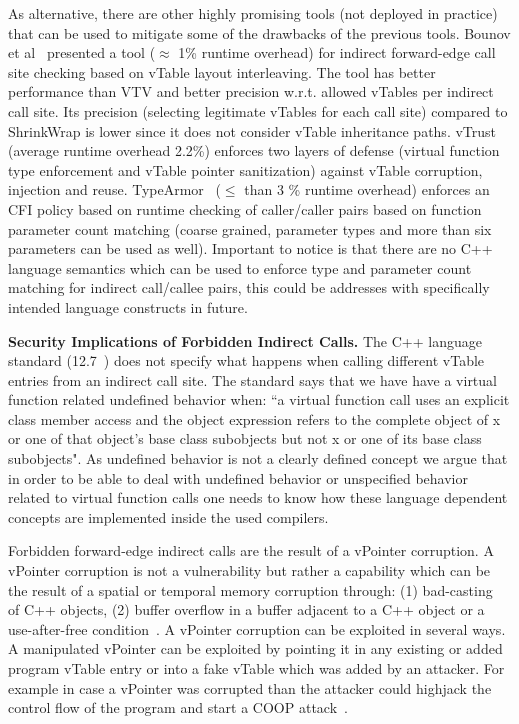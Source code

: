 As alternative, there are other highly promising tools (not deployed in practice) that can be used to mitigate 
some of the drawbacks of the previous tools. 
Bounov et al~\cite{bounov:interleaving} presented a tool ($\approx$ 1\% runtime overhead)
for indirect forward-edge call site checking based on vTable layout interleaving. The tool has better performance
than VTV and better precision w.r.t. allowed vTables per indirect call site. Its precision (selecting legitimate vTables for each call site)
compared to ShrinkWrap is lower since it does not consider vTable inheritance paths.
vTrust~\cite{zhang:vtrust} (average runtime overhead 2.2\%) enforces two layers of defense (virtual function type enforcement and vTable pointer sanitization)
against vTable corruption, injection and reuse.
TypeArmor~\cite{veen:typearmor} ($\le$ than 3 \% runtime overhead) enforces an CFI policy based on runtime checking of caller/caller pairs based
on function parameter count matching (coarse grained, parameter types and more than six parameters can be used as well).
Important to notice is that there are no C++ language semantics which can be used to enforce type and 
parameter count matching for indirect call/callee pairs, this could be addresses with specifically intended language constructs in future.

\textbf{Security Implications of Forbidden Indirect Calls.}
\label{Security Implications of Forbidden Forward Indirect Calls}
The C++ language standard (12.7~\cite{iso:iecN3690}) does not specify
what happens when calling different vTable entries from an indirect call site.
The standard says that we have have a virtual function related undefined behavior when:
``a virtual function call uses an explicit class member access and the object expression refers to the complete
object of x or one of that object’s base class subobjects but not x or one of its base class subobjects".
As undefined behavior is not a clearly defined concept we argue that in order to be able to deal
with undefined behavior or  unspecified behavior related to virtual function calls one needs to know
how these language dependent concepts are implemented inside the used compilers.

Forbidden forward-edge indirect calls are the result of a vPointer corruption.
A vPointer corruption is not a vulnerability but rather a capability which 
can be the result of a spatial or temporal memory corruption through: 
(1) bad-casting~\cite{byoungyoung:typecasting} of C++ objects, 
(2) buffer overflow in a buffer adjacent to a C++ object or a use-after-free condition~\cite{schuster:coop}.
A vPointer corruption can be exploited in several ways. A manipulated vPointer
can be exploited by pointing it in any existing or added program vTable entry 
or into a fake vTable which was added by an attacker. For example in case a vPointer
was corrupted than the attacker could highjack the control flow of the program 
and start a COOP attack~\cite{schuster:coop}.

